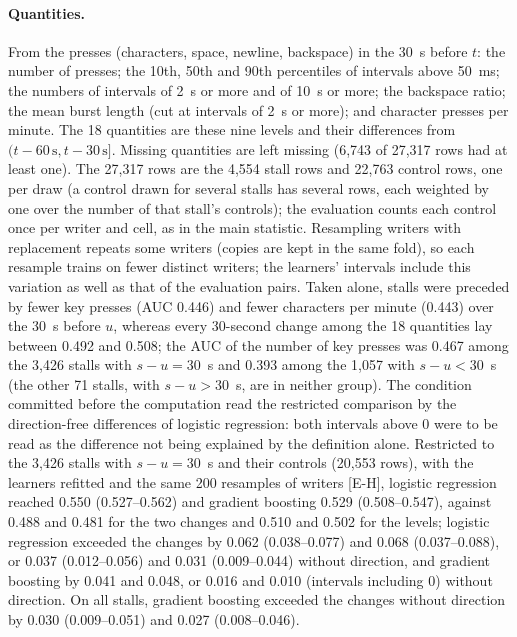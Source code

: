 \paragraph{Quantities.} From the presses (characters, space, newline, backspace) in the 30~s before $t$: the number of
presses; the 10th, 50th and 90th percentiles of intervals above 50~ms; the numbers of intervals of 2~s or more and of
10~s or more; the backspace ratio; the mean burst length (cut at intervals of 2~s or more); and character presses per
minute. The 18 quantities are these nine levels and their differences from $(t - 60\,\mathrm{s}, t - 30\,\mathrm{s}]$.
Missing quantities are left missing (6,743 of 27,317 rows had at least one). The 27,317 rows are the 4,554 stall rows
and 22,763 control rows, one per draw (a control drawn for several stalls has several rows, each weighted by one over
the number of that stall's controls); the evaluation counts each control once per writer and cell, as in the main
statistic. Resampling writers with replacement repeats some writers (copies are kept in the same fold), so each
resample trains on fewer distinct writers; the learners' intervals include this variation as well as that of the
evaluation pairs. Taken alone, stalls were preceded by fewer key presses (AUC 0.446) and fewer characters per minute
(0.443) over the 30~s before $u$, whereas every 30-second change among the 18 quantities lay between 0.492 and 0.508;
the AUC of the number of key presses was 0.467 among the 3,426 stalls with $s - u = 30$~s and 0.393 among the 1,057 with
$s - u < 30$~s (the other 71 stalls, with $s - u > 30$~s, are in neither group). The condition committed before the
computation read the restricted comparison by the direction-free differences of logistic regression: both intervals
above 0 were to be read as the difference not being explained by the definition alone. Restricted to the 3,426 stalls with $s - u = 30$~s and their controls (20,553 rows), with the learners refitted
and the same 200 resamples of writers [E-H], logistic regression reached 0.550 (0.527--0.562) and gradient boosting 0.529
(0.508--0.547), against 0.488 and 0.481 for the two changes and 0.510 and 0.502 for the levels; logistic regression
exceeded the changes by 0.062 (0.038--0.077) and 0.068 (0.037--0.088), or 0.037 (0.012--0.056) and 0.031 (0.009--0.044)
without direction, and gradient boosting by 0.041 and 0.048, or 0.016 and 0.010 (intervals including 0) without
direction. On all stalls, gradient boosting exceeded the changes without direction by 0.030 (0.009--0.051) and 0.027
(0.008--0.046).

